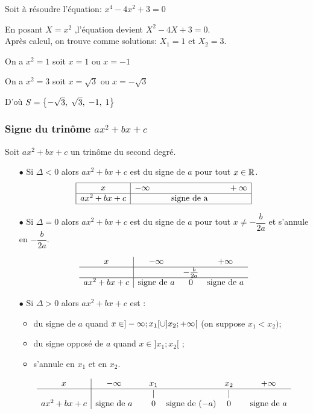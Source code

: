 \begin{example}

Soit à résoudre l'équation: $ x^{4}-4x^{2}+3=0 $
\end{example}

En posant $ X=x^{2} $ ,\;l'équation devient  $ X^{2}-4X+3=0 $.\\Après calcul, on trouve comme solutions:\;  $ X_{1} =1$\;  et\;  $ X_{2}=3 $.
\medskip

On a  $ x^{2}=1 $ soit $ x=1 $ ou $ x=-1 $

\medskip
On a  $ x^{2}=3 $ soit $ x=\sqrt{3} $ ou $ x=-\sqrt{3} $ 

\medskip
D'où  $ S=\left\{-\sqrt{3},\;\sqrt{3},\;-1,\;1\right\} $


\subsubsection*{Signe du trinôme $ax^2+bx+c$}
\begin{property}

Soit $ax^2+bx+c$ un trinôme  du second degré.
\begin{itemize}
	\item[$ \bullet $] Si $ \Delta <0 $ alors $ax^2+bx+c$ est  du signe de $a$ pour tout $x\in\mathbb{R}$.
	\renewcommand{\arraystretch}{1}
  \[\begin{array}{|c|c|}
\hline
x   &-\infty~~~~~~~~~~~~\qquad   \qquad ~~~~+\infty\\ 
\hline
 ax^{2}+bx+c &   \text{signe\ de\ a }\\
\hline
\end{array}\]
	\item[$ \bullet $] Si $ \Delta =0 $ alors $ax^2+bx+c$ est  du signe de $a$ pour tout $x\neq-\dfrac{b}{2a}$ et s'annule en $-\dfrac{b}{2a}$.
	
	$$\begin{array}{c|ccc}
x & -\infty & & +\infty \\
\hline
& & -\frac{b}{2a} & \\
\hline
ax^2 + bx + c & \text{signe de } a & 0 & \text{signe de } a \\
\end{array}$$
	\item[$ \bullet $] Si $ \Delta  > 0 $ alors  $ax^2+bx+c$ est :
\begin{itemize}
	\item  du signe de $a$ quand $x\in ]-\infty;x_1[\cup]x_2;+\infty[$ \; (on suppose $ x_{1} < x_{2})$;
	\item du signe opposé de $a$ quand $x\in]x_1;x_2[$ ;
	\item s'annule en $x_1$ et en $x_2$.
\end{itemize}
$$\begin{array}{c|ccccccc}
x & -\infty & & x_1 & & x_2 & & +\infty \\
\hline
& & & \mid & & \mid & & \\
ax^2 + bx + c & \text{signe de } a & & 0 & \text{signe de } (-a) & 0 & & \text{signe de } a \\
\end{array}$$
\end{itemize}
\end{property}

